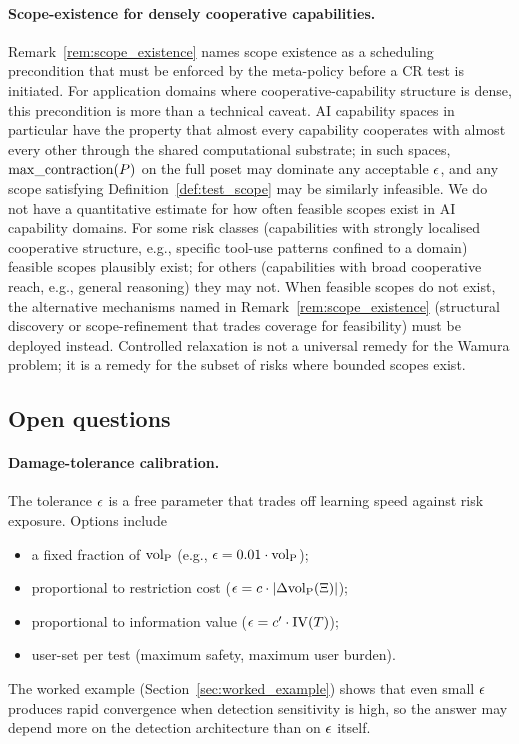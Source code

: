\paragraph{Scope-existence for densely cooperative capabilities.}
Remark~\ref{rem:scope_existence} names scope existence as a
scheduling precondition that must be enforced by the meta-policy
before a CR test is initiated.  For application domains where
cooperative-capability structure is dense, this precondition is
more than a technical caveat.  AI capability spaces in
particular have the property that almost every capability
cooperates with almost every other through the shared
computational substrate; in such spaces, $\mathrm{max\_contraction}(P)$ on the full
poset may dominate any acceptable $\epsilon$, and any scope
satisfying Definition~\ref{def:test_scope} may be similarly
infeasible.  We do not have a quantitative estimate for how
often feasible scopes exist in AI capability domains.  For some
risk classes (capabilities with strongly localised cooperative
structure, e.g., specific tool-use patterns confined to a
domain) feasible scopes plausibly exist; for others
(capabilities with broad cooperative reach, e.g., general
reasoning) they may not.  When feasible scopes do not exist, the
alternative mechanisms named in
Remark~\ref{rem:scope_existence} (structural discovery
\citep[Proposition~2]{lasser2026horizon} or scope-refinement
that trades coverage for feasibility) must be deployed instead.
Controlled relaxation is not a universal remedy for the Wamura
problem; it is a remedy for the subset of risks where bounded
scopes exist.

\subsection{Open questions}

\paragraph{Damage-tolerance calibration.}
The tolerance $\epsilon$ is a free parameter that trades off
learning speed against risk exposure.  Options include
\begin{itemize}
\item a fixed fraction of ${\operatorname{vol}_{\mathrm{P}}}$ (e.g.,
  $\epsilon = 0.01 \cdot {\operatorname{vol}_{\mathrm{P}}}$);
\item proportional to restriction cost
  ($\epsilon = c \cdot |\Delta {\operatorname{vol}_{\mathrm{P}}}(\Xi)|$);
\item proportional to information value
  ($\epsilon = c' \cdot \mathrm{IV}(T)$);
\item user-set per test (maximum safety, maximum user burden).
\end{itemize}
The worked example (Section~\ref{sec:worked_example}) shows that
even small $\epsilon$ produces rapid convergence when
detection sensitivity is high, so the answer may depend more on
the detection architecture than on $\epsilon$ itself.

